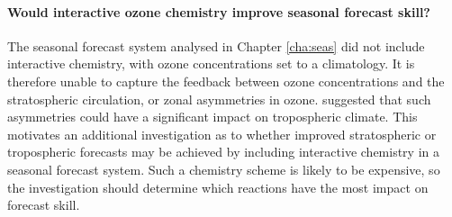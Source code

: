 \paragraph{Would interactive ozone chemistry improve seasonal forecast skill?}
The seasonal forecast system analysed in Chapter \ref{cha:seas} did not include
interactive chemistry, with ozone concentrations set to a climatology. It is
therefore unable to capture the feedback between ozone concentrations and the
stratospheric circulation, or zonal asymmetries in ozone. \citet{Waugh2009}
suggested that such asymmetries could have a significant impact on tropospheric
climate. This motivates an additional investigation as to whether improved
stratospheric or tropospheric forecasts may be achieved by including interactive
chemistry in a seasonal forecast system. Such a chemistry scheme is likely to be
expensive, so the investigation should determine which reactions have the most
impact on forecast skill.




